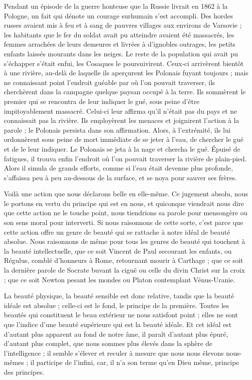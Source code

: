\documentclass[a4paper, 11pt, oneside]{article}
\begin{document}
Pendant un épisode de la guerre honteuse que la Russie livrait en 1862 à la Pologne, un fait qui dénote un courage surhumain s'est accompli. Des hordes russes avaient mis à feu et à sang de pauvres villages aux environs de Varsovie ; les habitants que le fer du soldat avait pu atteindre avaient été massacrés, les femmes arrachées de leurs demeures et livrées à d'ignobles outrages, les petits enfants laissés mourants dans les neiges. Le reste de la population qui avait pu s'échapper s'était enfui, les Cosaques le poursuivirent. Ceux-ci arrivèrent bientôt à une rivière, au-delà de laquelle ils aperçurent les Polonais fuyant toujours ; mais ne connaissant point l'endroit guéable par où l'on pouvait traverser, ils cherchèrent dans la campagne quelque paysan occupé à la terre. Ils sommèrent le premier qui se rencontra de leur indiquer le gué, sous peine d'être impitoyablement massacré. Celui-ci leur affirma qu'il n'était pas du pays et ne connaissait pas la rivière. Ils employèrent les menaces et joignirent l'action à la parole ; le Polonais persista dans son affirmation. Alors, à l'extrémité, ils lui ordonnèrent sous peine de mort immédiate de se jeter à l'eau, de chercher le gué et de le leur indiquer. Le Polonais se jeta à la nage et chercha le gué. Épuisé de fatigues, il trouva enfin l'endroit où l'on pouvait traverser la rivière de plain-pied. Alors il simula de grands efforts, comme si l'eau était devenue plus profonde, s'affaissa peu à peu au-dessous de la surface, et se noya pour sauver ses frères.

Voilà une action que nous déclarons belle en elle-même. Ce jugement absolu, nous le portons en vertu du principe qui est en nous, et quiconque viendrait nous dire que cette action ne le touche point, nous tiendrions sa parole pour mensongère ou son sens moral pour interverti. Si nous raisonnons de cette sorte, c'est parce que cette action offre un genre de beauté qui se rattache à notre idéal de beauté absolue. Nous raisonnons de même pour tous les genres de beauté qui touchent à la beauté intellectuelle, que ce soit Vincent de Paul secourant les enfants, ou Régulus, comblé d'honneurs à Rome, retournant mourir à Carthage ; que ce soit la dernière parole de Socrate buvant la ciguë ou celle du divin Christ sur la croix ; que ce soit Newton pesant les mondes ou Platon contemplant Vénus-Uranie.

La beauté physique, la beauté sensible est donc relative, tandis que la beauté idéale est absolue ; celle-ci est le fond, le principe de la première. Toutes les beautés qui constituent le beau extérieur ne nous satisfont point ; elles ne sont que l'indice d'une beauté supérieure qui est la beauté idéale. Et cet idéal est d'autant plus apparent au fond de notre âme, il paraît d'autant plus épuré, d'autant plus complet, que nous sommes plus élevés dans la sphère de l'intelligence ; il semble s'élever et reculer à mesure que nous nous élevons nous-mêmes ; il participe de l'infini, car, il n'a son terme qu'en Dieu même, principe des principes.
\end{document}

